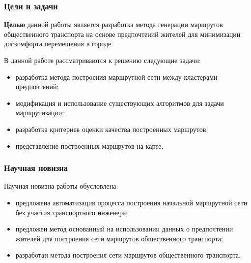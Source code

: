 \begin{frame}
    \frametitle{Цели и задачи}
    \textbf{Целью} данной работы является разработка метода генерации маршрутов общественного 
    транспорта на основе предпочтений жителей для минимизации дискомфорта перемещения в городе.

    В данной работе рассматриваются к решению следующие задачи:
    \begin{itemize}
        \item разработка метода построения маршрутной сети между кластерами предпочтений;
        \item модификация и использование существующих алгоритмов для задачи маршрутизации;
        \item разработка критериев оценки качества построенных маршрутов;
        \item представление построенных маршрутов на карте.
    \end{itemize}
\end{frame}

\begin{frame}
    \frametitle{Научная новизна}
    Научная новизна работы обусловлена:
    \begin{itemize}
        \item предложена автоматизация процесса построения начальной маршрутной сети без участия 
            транспортного инженера;
        \item предложен метод основанный на использовании данных о предпочтении жителей для построения 
            сети маршрутов общественного транспорта;
        \item разработан метода построения сети маршрутов общественного транспорта.
    \end{itemize}
\end{frame}

